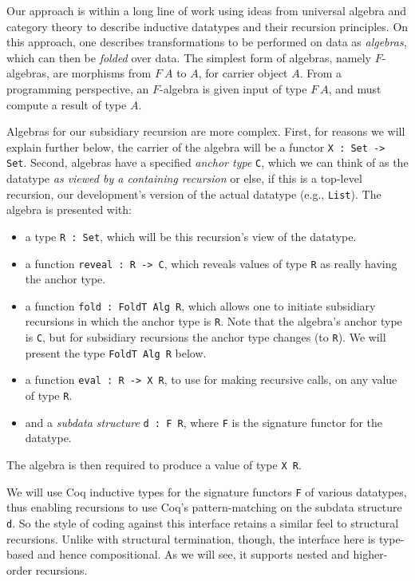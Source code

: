 \documentclass[a4paper,USenglish]{lipics-v2021}
\begin{document}
Our approach is within a long line of work using ideas from universal
algebra and category theory to describe inductive datatypes and their
recursion principles.  On this approach, one describes transformations
to be performed on data as \emph{algebras}, which can then be
\textit{folded} over data.  The simplest form of algebras, namely
$F$-algebras, are morphisms from $F\ A$ to $A$, for carrier object
$A$.  From a programming perspective, an $F$-algebra is given input of
type $F\ A$, and must compute a result of type $A$.

Algebras for our subsidiary recursion are more complex.  First, for
reasons we will explain further below, the carrier of the algebra will
be a functor \verb|X : Set -> Set|.  Second, algebras have a specified
\emph{anchor type} \verb|C|, which we can think of as the datatype
\emph{as viewed by a containing recursion} or else, if this is a
top-level recursion, our development's version of the actual datatype
(e.g., \verb|List|).  The algebra is presented with:

\begin{itemize}
\item a type \verb|R : Set|, which will be this recursion's view of the datatype.
\item a function \verb|reveal : R -> C|, which reveals values of type \verb|R| as really having the anchor type.  
\item a function \verb|fold : FoldT Alg R|, which allows one to initiate subsidiary recursions in which the anchor type is \verb|R|.  Note that the algebra's anchor type is \verb|C|, but for subsidiary recursions the anchor type changes (to \verb|R|). We will present the type \verb|FoldT Alg R| below.
\item a function \verb|eval : R -> X R|, to use for making recursive calls, on any value of type \verb|R|.
\item and a \emph{subdata structure} \verb|d : F R|, where \verb|F| is the signature functor for the datatype.
\end{itemize}

\noindent The algebra is then required to produce a value of type \verb|X R|.

We will use Coq inductive types for the signature functors \verb|F| of
various datatypes, thus enabling recursions to use Coq's
pattern-matching on the subdata structure \verb|d|.  So the style of
coding against this interface retains a similar feel to structural
recursions.  Unlike with structural termination, though, the interface
here is type-based and hence compositional.  As we will see, it
supports nested and higher-order recursions.
\end{document}
